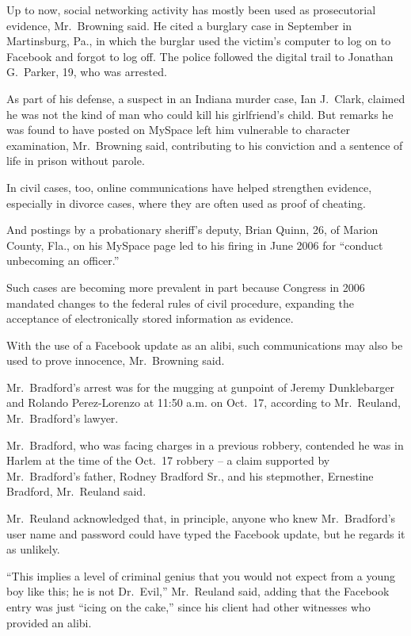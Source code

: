 ﻿\documentclass[12pt]{article}
\begin{document}
Up to now, social networking activity has mostly been used as prosecutorial evidence, Mr.~Browning
said. He cited a burglary case in September in Martinsburg, Pa., in which the burglar used the
victim's computer to log on to Facebook and forgot to log off. The police followed the digital trail
to Jonathan G.~Parker, 19, who was arrested.

As part of his defense, a suspect in an Indiana murder case, Ian J.~Clark, claimed he was not the
kind of man who could kill his girlfriend's child. But remarks he was found to have posted on
MySpace left him vulnerable to character examination, Mr.~Browning said, contributing to his
conviction and a sentence of life in prison without parole.

In civil cases, too, online communications have helped strengthen evidence, especially in divorce
cases, where they are often used as proof of cheating.

And postings by a probationary sheriff's deputy, Brian Quinn, 26, of Marion County, Fla., on his
MySpace page led to his firing in June 2006 for ``conduct unbecoming an officer.''

Such cases are becoming more prevalent in part because Congress in 2006 mandated changes to the
federal rules of civil procedure, expanding the acceptance of electronically stored information as
evidence.

With the use of a Facebook update as an alibi, such communications may also be used to prove
innocence, Mr.~Browning said.

Mr.~Bradford's arrest was for the mugging at gunpoint of Jeremy Dunklebarger and Rolando
Perez-Lorenzo at 11:50 a.m. on Oct.~17, according to Mr.~Reuland, Mr.~Bradford's lawyer.

Mr.~Bradford, who was facing charges in a previous robbery, contended he was in Harlem at the time
of the Oct.~17 robbery -- a claim supported by Mr.~Bradford's father, Rodney Bradford Sr., and his
stepmother, Ernestine Bradford, Mr.~Reuland said.

Mr.~Reuland acknowledged that, in principle, anyone who knew Mr.~Bradford's user name and password
could have typed the Facebook update, but he regards it as unlikely.

``This implies a level of criminal genius that you would not expect from a young boy like this; he
is not Dr.~Evil,'' Mr.~Reuland said, adding that the Facebook entry was just ``icing on the cake,''
since his client had other witnesses who provided an alibi.
\end{document}
